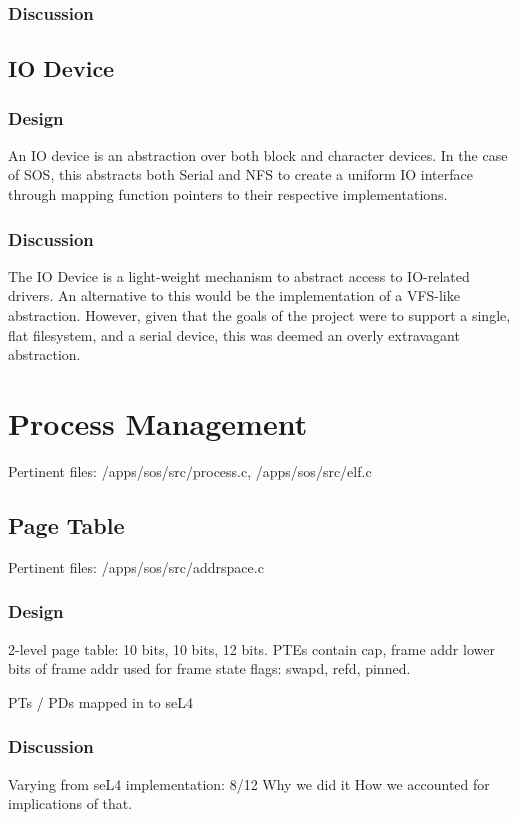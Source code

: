 \documentclass[a4paper,12pt]{article}
\begin{document}
\subsubsection{Discussion}

\subsection{IO Device}
\subsubsection{Design}
An IO device is an abstraction over both block and character devices.  In the
case of SOS, this abstracts both Serial and NFS to create a uniform IO
interface through mapping function pointers to their respective
implementations.

\subsubsection{Discussion}
The IO Device is a light-weight mechanism to abstract access to IO-related
drivers.  An alternative to this would be the implementation of a VFS-like
abstraction.  However, given that the goals of the project were to support a
single, flat filesystem, and a serial device, this was deemed an overly
extravagant abstraction.

\section{Process Management}
Pertinent files: /apps/sos/src/process.c, /apps/sos/src/elf.c

\subsection{Page Table}
Pertinent files: /apps/sos/src/addrspace.c

\subsubsection{Design}
2-level page table: 10 bits, 10 bits, 12 bits.
PTEs contain cap, frame addr
lower bits of frame addr used for frame state flags: swapd, refd, pinned.

PTs / PDs mapped in to seL4
\subsubsection{Discussion}
Varying from seL4 implementation: 8/12
Why we did it
How we accounted for implications of that.
\end{document}
